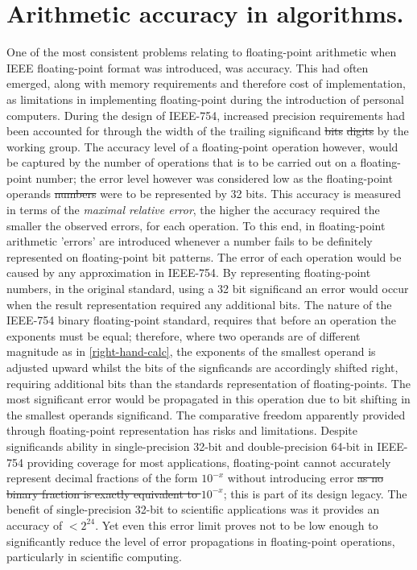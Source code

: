 \documentclass[7pt]{article}
\begin{document}
\section*{Arithmetic accuracy in algorithms.}
One of the most consistent problems relating to floating-point arithmetic when IEEE floating-point format was introduced, was accuracy. This had often emerged, along with memory requirements and therefore cost of implementation, as limitations in implementing floating-point during the introduction of personal computers. During the design of IEEE-754, increased precision requirements had been accounted for through the width of the trailing significand \st{bits} \st{digits} by the working group. The accuracy level of a floating-point operation however, would be captured by the number of operations that is to be carried out on a floating-point number; the error level however was considered low as the floating-point operands \st{numbers} were to be represented by 32 bits. This accuracy is measured in terms of the \textit{maximal relative error}, the higher the accuracy required the smaller the observed errors, for each operation. To this end, in floating-point arithmetic  'errors' are introduced whenever a number fails to be definitely represented on floating-point bit patterns. The error of each operation would be caused by any approximation in IEEE-754. By representing floating-point numbers, in the original standard, using a 32 bit significand an error would occur when the result representation required any additional bits. The nature of the IEEE-754 binary floating-point standard, requires that before an operation the exponents must be equal; therefore, where two operands are of different magnitude as in \ref{right-hand-calc}, the exponents of the smallest operand is adjusted upward whilst the bits of the signficands are accordingly shifted right, requiring additional bits than the standards representation of floating-points. The most significant error would be propagated in this operation due to bit shifting in the smallest operands significand. The comparative freedom apparently provided through floating-point representation has risks and limitations. Despite significands ability in single-precision 32-bit and double-precision 64-bit in IEEE-754 providing coverage for most applications, floating-point cannot accurately represent decimal fractions of the form $10^{-x}$ without introducing error \st{as no binary fraction is exactly equivalent to $10^{-x}$}; this is part of its design legacy. The benefit of single-precision 32-bit to scientific applications was it provides an accuracy of $<2^{24}$. Yet even this error limit proves not to be low enough to significantly reduce the level of error propagations in floating-point operations, particularly in scientific computing.
\end{document}
